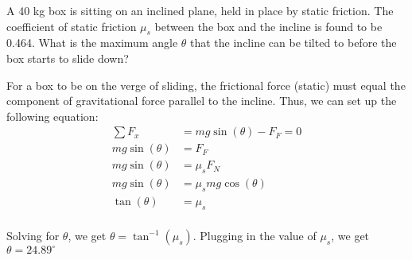 \begin{Exercise}[title=Solving for angle $\theta$, label=incline2]
    A 40 kg box is sitting on an inclined plane, held in place by static friction. The coefficient of static friction $\mu_s$ between the box and the incline is found to be 0.464. What is the maximum angle $\theta$ that the incline can be tilted to before the box starts to slide down?
\end{Exercise}
\begin{Answer}[ref=incline2]
For a box to be on the verge of sliding, the frictional force (static) must equal the component of gravitational force parallel to the incline. Thus, we can set up the following equation:
\begin{align*}
    \sum F_x &= mg\sin(\theta) - F_F = 0 \\
    mg\sin(\theta) &= F_F \\
    mg\sin(\theta) &= \mu_s F_N \\
    mg\sin(\theta) &= \mu_s mg\cos(\theta) \\
    \tan(\theta) &= \mu_s \\
\end{align*}

Solving for $\theta$, we get $\theta = \tan^{-1}(\mu_s)$. 
Plugging in the value of $\mu_s$, we get $\theta = 24.89^\circ$
\end{Answer}


